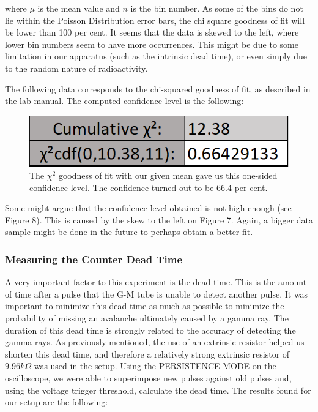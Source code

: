 \documentclass[a4paper]{article}
\begin{document}
  where $\mu$ is the mean value and $n$ is the bin number. As some of the bins do not lie within the Poisson Distribution error bars, the chi square goodness of fit will be lower than 100 per cent. It seems that the data is skewed to the left, where lower bin numbers seem to have more occurrences. This might be due to some limitation in our apparatus (such as the intrinsic dead time), or even simply due to the random nature of radioactivity. 
  
  The following data corresponds to the chi-squared goodness of fit, as described in the lab manual. The computed confidence level is the following:
  
  
  \begin{figure}[h]
  \includegraphics[scale=1.0]{chisquared} 
  \centering
  \caption{The $\chi^{2}$ goodness of fit with our given mean gave us this one-sided confidence level. The confidence turned out to be $66.4$ per cent.}
  \end{figure}

Some might argue that the confidence level obtained is not high enough (see Figure 8). This is caused by the skew to the left on Figure 7. Again, a bigger data sample might be done in the future to perhaps obtain a better fit.

  \subsubsection{Measuring the Counter Dead Time}
  A very important factor to this experiment is the dead time. This is the amount of time after a pulse that the G-M tube is unable to detect another pulse. It was important to minimize this dead time as much as possible to minimize the probability of missing an avalanche ultimately caused by a gamma ray. The duration of this dead time is strongly related to the accuracy of detecting the gamma rays. As previously mentioned, the use of an extrinsic resistor helped us shorten this dead time, and therefore a relatively strong extrinsic resistor of $9.96k\Omega$ was used in the setup. Using the PERSISTENCE MODE on the oscilloscope, we were able to superimpose new pulses against old pulses and, using the voltage trigger threshold, calculate the dead time. The results found for our setup are the following:
  
\end{document}
